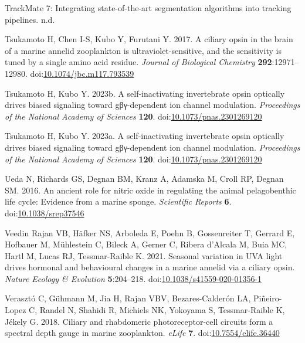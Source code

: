 \documentclass[
  11pt,
  letterpaper,
  DIV=11,
  numbers=noendperiod]{scrartcl}
\newlength{\cslhangindent}
\newenvironment{CSLReferences}[2] %
 {\begin{list}{}{%
  \setlength{\itemindent}{0pt}
  \setlength{\leftmargin}{0pt}
  \setlength{\parsep}{0pt}
  \ifodd #1
   \setlength{\leftmargin}{\cslhangindent}
   \setlength{\itemindent}{-1\cslhangindent}
  \fi
  \setlength{\itemsep}{#2\baselineskip}}}
 {\end{list}}
\begin{document}
\begin{CSLReferences}{1}{0}
TrackMate 7: Integrating state-of-the-art segmentation algorithms into
tracking pipelines. n.d.

Tsukamoto H, Chen I-S, Kubo Y, Furutani Y. 2017. A ciliary opsin in the
brain of a marine annelid zooplankton is ultraviolet-sensitive, and the
sensitivity is tuned by a single amino acid residue. \emph{Journal of
Biological Chemistry} \textbf{292}:12971--12980.
doi:\href{https://doi.org/10.1074/jbc.m117.793539}{10.1074/jbc.m117.793539}

Tsukamoto H, Kubo Y. 2023b. A self-inactivating invertebrate opsin
optically drives biased signaling toward gβγ-dependent ion channel
modulation. \emph{Proceedings of the National Academy of Sciences}
\textbf{120}.
doi:\href{https://doi.org/10.1073/pnas.2301269120}{10.1073/pnas.2301269120}

Tsukamoto H, Kubo Y. 2023a. A self-inactivating invertebrate opsin
optically drives biased signaling toward gβγ-dependent ion channel
modulation. \emph{Proceedings of the National Academy of Sciences}
\textbf{120}.
doi:\href{https://doi.org/10.1073/pnas.2301269120}{10.1073/pnas.2301269120}

Ueda N, Richards GS, Degnan BM, Kranz A, Adamska M, Croll RP, Degnan SM.
2016. An ancient role for nitric oxide in regulating the animal
pelagobenthic life cycle: Evidence from a marine sponge.
\emph{Scientific Reports} \textbf{6}.
doi:\href{https://doi.org/10.1038/srep37546}{10.1038/srep37546}

Veedin Rajan VB, Häfker NS, Arboleda E, Poehn B, Gossenreiter T, Gerrard
E, Hofbauer M, Mühlestein C, Bileck A, Gerner C, Ribera d'Alcala M, Buia
MC, Hartl M, Lucas RJ, Tessmar-Raible K. 2021. Seasonal variation in UVA
light drives hormonal and behavioural changes in a marine annelid via a
ciliary opsin. \emph{Nature Ecology \& Evolution} \textbf{5}:204--218.
doi:\href{https://doi.org/10.1038/s41559-020-01356-1}{10.1038/s41559-020-01356-1}

Verasztó C, Gühmann M, Jia H, Rajan VBV, Bezares-Calderón LA,
Piñeiro-Lopez C, Randel N, Shahidi R, Michiels NK, Yokoyama S,
Tessmar-Raible K, Jékely G. 2018. Ciliary and rhabdomeric
photoreceptor-cell circuits form a spectral depth gauge in marine
zooplankton. \emph{eLife} \textbf{7}.
doi:\href{https://doi.org/10.7554/elife.36440}{10.7554/elife.36440}


\end{CSLReferences}
\end{document}
